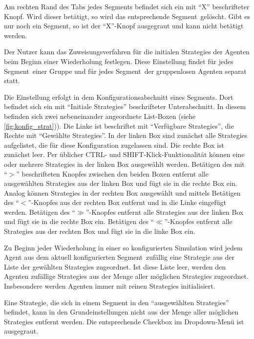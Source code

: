 \documentclass[parskip=full,11pt]{scrartcl}
\def\segment{Segment}
\begin{document}
Am rechten Rand des Tabs jedes \segment s befindet sich ein mit \enquote{X} beschrifteter Knopf. Wird dieser betätigt, so wird das entsprechende \segment\ gelöscht. Gibt es nur noch ein \segment, so ist der \enquote{X}-Knopf ausgegraut und kann nicht betätigt werden.

Der \Gls{Nutzer} kann das Zuweisungsverfahren für die initialen \Glspl{Strategie} der Agenten beim Beginn einer Wiederholung festlegen. Diese Einstellung findet für jedes \segment\ einer Gruppe und für jedes \segment\ der gruppenlosen Agenten separat statt.

Die Einstellung erfolgt in dem Konfigurationsabschnitt eines \segment s. Dort befindet sich ein mit \enquote{Initiale \Glspl{Strategie}} beschrifteter Unterabschnitt. In diesem befinden sich zwei nebeneinander angeordnete List-Boxen (siehe \cref{fig:konfig_strat})). Die Linke ist beschriftet mit \enquote{Verfügbare \Glspl{Strategie}}, die Rechte mit \enquote{Gewählte \Glspl{Strategie}}. In der linken Box sind zunächst alle \Glspl{Strategie} aufgelistet, die für diese \Gls{Konfiguration} zugelassen sind. Die rechte Box ist zunächst leer. Per üblicher \textsf{CTRL}- und \textsf{SHIFT}-Klick-Funktionalität können eine oder mehrere \Glspl{Strategie} in der linken Box ausgewählt werden. Betätigen des mit \enquote{\(>\)} beschrifteten Knopfes zwischen den beiden Boxen entfernt alle ausgewählten \Glspl{Strategie} aus der linken Box und fügt sie in die rechte Box ein. Analog können \Glspl{Strategie} in der rechten Box ausgewählt und mittels Betätigen des \enquote{\(<\)}-Knopfes aus der rechten Box entfernt und in die Linke eingefügt werden. Betätigen des \enquote{\(\gg\)}-Knopfes entfernt alle \Glspl{Strategie} aus der linken Box und fügt sie in die rechte Box ein. Betätigen des \enquote{\(\ll\)}-Knopfes entfernt alle \Glspl{Strategie} aus der rechten Box und fügt sie in die linke Box ein.

Zu Beginn jeder Wiederholung in einer so konfigurierten Simulation wird jedem Agent aus dem aktuell konfigurierten \segment\ zufällig eine \Gls{Strategie} aus der Liste der gewählten \Glspl{Strategie} zugeordnet. Ist diese Liste leer, werden den Agenten zufällige \Glspl{Strategie} aus der Menge aller möglichen \Glspl{Strategie} zugeordnet. Insbesondere werden Agenten immer mit reinen \Glspl{Strategie} initialisiert.

Eine \Gls{Strategie}, die sich in einem Segment in den \enquote{ausgewählten \Glspl{Strategie}} befindet, kann in den Grundeinstellungen nicht aus der Menge aller möglichen \Glspl{Strategie} entfernt werden. Die entsprechende Checkbox im Dropdown-Menü ist ausgegraut.
\end{document}
